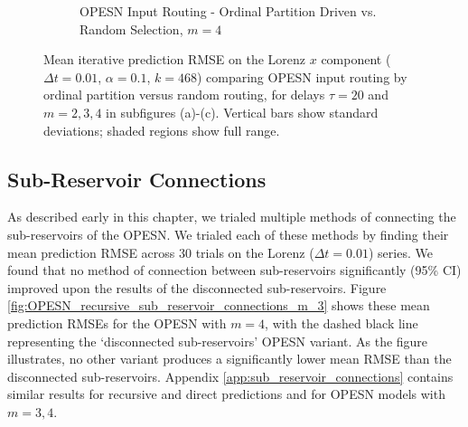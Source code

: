 \begin{figure}
    \begin{subfigure}[t]{\textwidth}
        \caption{OPESN Input Routing - Ordinal Partition Driven vs. Random Selection, $m=4$}
        \label{fig:OPESN_routing_recursive_m_4}
        \centering
    \end{subfigure}

    \caption{Mean iterative prediction RMSE on the Lorenz $x$ component ($\Delta t=0.01$, $\alpha=0.1$, $k=468$) comparing OPESN input routing by ordinal partition versus random routing, for delays $\tau=20$ and $m=2,3,4$ in subfigures (a)-(c). Vertical bars show standard deviations; shaded regions show full range.}
    \label{fig:OPESN_routing_recursive_ordinal_vs_random}
\end{figure}

\subsection{Sub-Reservoir Connections}

As described early in this chapter, we trialed multiple methods of connecting the sub-reservoirs of the OPESN. We trialed each of these methods by finding their mean prediction RMSE across 30 trials on the Lorenz ($\Delta t = 0.01$) series. We found that no method of connection between sub-reservoirs significantly (95\% CI) improved upon the results of the disconnected sub-reservoirs. Figure \ref{fig:OPESN_recursive_sub_reservoir_connections_m_3} shows these mean prediction RMSEs for the OPESN with $m=4$, with the dashed black line representing the `disconnected sub-reservoirs' OPESN variant. As the figure illustrates, no other variant produces a significantly lower mean RMSE than the disconnected sub-reservoirs. Appendix \ref{app:sub_reservoir_connections} contains similar results for recursive and direct predictions and for OPESN models with $m=3,4$.

